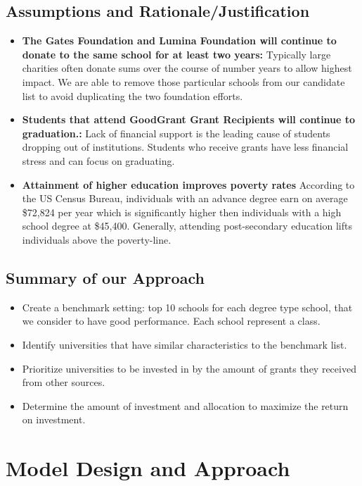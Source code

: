 \documentclass[12pt]{scrartcl}
\begin{document}
	\subsection{Assumptions and Rationale/Justification}
	\begin{itemize}
		\item \textbf{The Gates Foundation and Lumina Foundation will continue to donate to the same school for at least two years:} Typically large charities often donate sums over the course of number years to allow highest impact. \cite{Conkey} We are able to remove those particular schools from our candidate list to avoid duplicating the two foundation efforts. 
				
		\item \textbf{Students that attend GoodGrant Grant Recipients will continue to graduation.:}  Lack of financial support is the leading cause of students dropping out of institutions. Students who receive grants have less financial stress and can focus on graduating.\cite{Trom}
		
		\item \textbf{Attainment of higher education improves poverty rates} According to the US Census Bureau, individuals with an advance degree earn on average \$72,824 per year which is significantly higher then individuals with a high school degree at \$45,400.\cite{dis} Generally, attending post-secondary education lifts individuals above the poverty-line. 

	\end{itemize}
	
	\subsection{Summary of our Approach}
		\begin{itemize}
		\item Create a benchmark setting: top 10 schools for each degree type school, that we consider to have good performance. Each school represent a class.  
		\item Identify universities that have similar characteristics to the benchmark list. 
		\item Prioritize universities to be invested in by the amount of grants they received from other sources.
		\item Determine the amount of investment and allocation to maximize the return on investment. 
		\end{itemize}
				 
\section{Model Design and Approach}
\end{document}
